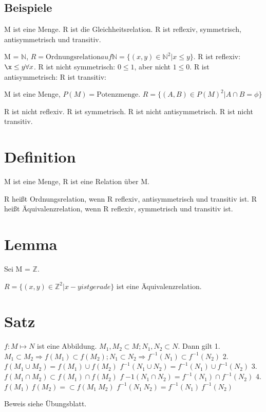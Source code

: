 \documentclass[a4paper,10pt]{article}
\begin{document}
\subsection{Beispiele}

M ist eine Menge. R ist die Gleichheitsrelation. R ist reflexiv, symmetrisch, antisymmetrisch und transitiv.

M = $\mathbb{N}$, $R = \text{Ordnungsrelation} auf \mathbb{N} = \{(x, y) \in \mathbb{N}^2 | x \le y\}$.
R ist reflexiv: $\x \le y \forall x$.
R ist nicht symmetrisch: $0 \le 1$, aber nicht $ 1 \le 0$.
R ist antisymmetrisch: 
R ist transitiv:

M ist eine Menge, $P(M) = \text{Potenzmenge}$.
$R = \{(A, B) \in P(M)^2 | A \cap B = \phi \}$

R ist nicht reflexiv.
R ist symmetrisch.
R ist nicht antisymmetrisch.
R ist nicht transitiv.

\section{Definition}

M ist eine Menge, R ist eine Relation über M.

R heißt Ordnungsrelation, wenn R reflexiv, antisymmetrisch und transitiv ist.
R heißt Äquivalenzrelation, wenn R reflexiv, symmetrisch und transitiv ist.

\section{Lemma}

Sei M = $\mathbb{Z}$.

$R = \{ (x, y) \in \mathbb{Z}^2 | x - y ist gerade \}$
ist eine Äquivalenzrelation.

\section{Satz}

$f: M \mapsto N$ ist eine Abbildung. $M_1, M_2 \subset M; N_1, N_2 \subset N$.
Dann gilt
1. $M_1 \subset M_2 \Rightarrow f(M_1) \subset f(M_2); N_1 \subset N_2 \Rightarrow f^{-1}(N_1) \subset f^{-1}(N_2)$
2. $f(M_1 \cup M_2) = f(M_1) \cup f(M_2)$
$f^{-1}(N_1 \cup N_2) = f^{-1}(N_1) \cup f^{-1}(N_2)$
3. $f(M_1 \cap M_2) \subset f(M_1) \cap f(M_2)$
$f^·{-1}(N_1 \cap N_2) = f^{-1}(N_1) \cap f^{-1}(N_2)$
4. $f(M_1) \ f(M_2) = \subset f(M_1 \ M_2)$
$f^{-1}(N_1 \ N_2) = f^{-1}(N_1) \ f^{-1}(N_2)$

Beweis siehe Übungsblatt.
\end{document}
